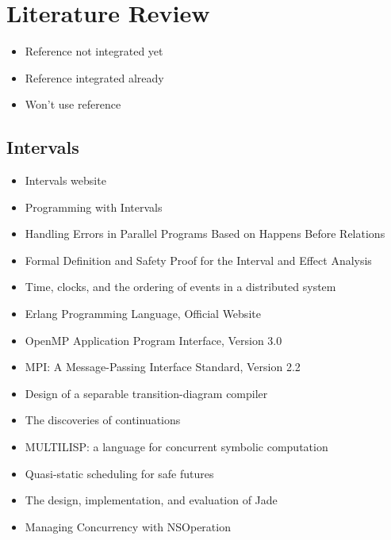 
\chapter{Literature Review}
\label{cha:literature-review}

\begin{itemize}
\item[\textbullet] Reference not integrated yet
\item[\checkmark] Reference integrated already
\item[\texttimes] Won't use reference
\end{itemize}


\section*{Intervals}
\label{sec:lr-intervals}

\begin{itemize}
\item[\checkmark] Intervals website \cite{Matsakis2010}
\item[\checkmark] Programming with Intervals \cite{Matsakis2009b}
\item[\checkmark] Handling Errors in Parallel Programs Based on
  Happens Before Relations \cite{Matsakis2010a}
\item[\checkmark] Formal Definition and Safety Proof for the Interval
  and Effect Analysis \cite{Matsakis2009}
\item[\checkmark] Time, clocks, and the ordering of events in a
  distributed system \cite{Lamport1978}
\item[\textbullet] Erlang Programming Language, Official Website
  \cite{Erlang2010}
\item[\textbullet] OpenMP Application Program Interface, Version 3.0
  \cite{OpenMP2008}
\item[\textbullet] MPI: A Message-Passing Interface Standard, Version
  2.2 \cite{MPI2009}
\item[\textbullet] Design of a separable transition-diagram compiler
  \cite{Conway1963}
\item[\textbullet] The discoveries of continuations
  \cite{Reynolds1993}
\item[\textbullet] MULTILISP: a language for concurrent symbolic
  computation \cite{Halstead1985}
\item[\textbullet] Quasi-static scheduling for safe futures
  \cite{Navabi2008}
\item[\textbullet] The design, implementation, and evaluation of Jade
  \cite{Rinard1998}
\item[\textbullet] Managing Concurrency with NSOperation
  \cite{Apple2008}
\end{itemize}


